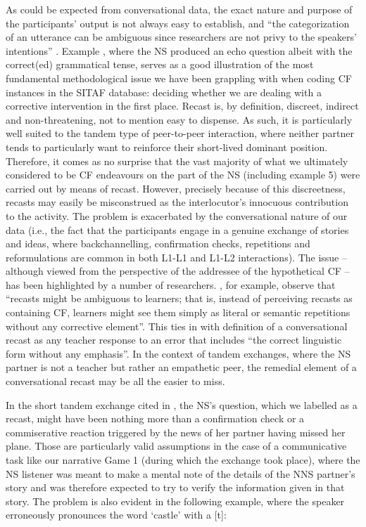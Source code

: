 \documentclass[output=paper,colorlinks,citecolor=brown,modfonts,nonflat]{../langscibook}
\begin{document}
As could be expected from conversational data, the exact nature and purpose of the participants’ output is not always easy to establish, and “the categorization of an utterance can be ambiguous since researchers are not privy to the speakers’ intentions” \citep[44]{Ballinger2015}. Example , where the NS produced an echo question albeit with the correct(ed) grammatical tense, serves as a good illustration of the most fundamental methodological issue we have been grappling with when coding CF instances in the SITAF database: deciding whether we are dealing with a corrective intervention in the first place. Recast is, by definition, discreet, indirect and non-threatening, not to mention easy to dispense. As such, it is particularly well suited to the tandem type of peer-to-peer interaction, where neither partner tends to particularly want to reinforce their short-lived dominant position. Therefore, it comes as no surprise that the vast majority of what we ultimately considered to be CF endeavours on the part of the NS (including example 5) were carried out by means of recast. However, precisely because of this discreetness, recasts may easily be misconstrued as the interlocutor’s innocuous contribution to the activity. The problem is exacerbated by the conversational nature of our data (i.e., the fact that the participants engage in a genuine exchange of stories and ideas, where backchannelling, confirmation checks, repetitions and reformulations are common in both L1-L1 and L1-L2 interactions). The issue – although viewed from the perspective of the addressee of the hypothetical CF – has been highlighted by a number of researchers. \citet[209]{CarpenterEtAl2006}, for example, observe that “recasts might be ambiguous to learners; that is, instead of perceiving recasts as containing CF, learners might see them simply as literal or semantic repetitions without any corrective element”. This ties in with  definition of a conversational recast as any teacher response to an error that includes “the correct linguistic form without any emphasis”. In the context of tandem exchanges, where the NS partner is not a teacher but rather an empathetic peer, the remedial element of a conversational recast may be all the easier to miss.



In the short tandem exchange cited in , the NS’s question, which we labelled as a recast, might have been nothing more than a confirmation check or a commiserative reaction triggered by the news of her partner having missed her plane. Those are particularly valid assumptions in the case of a communicative task like our narrative Game 1 (during which the exchange took place), where the NS listener was meant to make a mental note of the details of the NNS partner’s story and was therefore expected to try to verify the information given in that story. The problem is also evident in the following example, where the  speaker erroneously pronounces the word ‘castle’ with a [t]:
\end{document}
